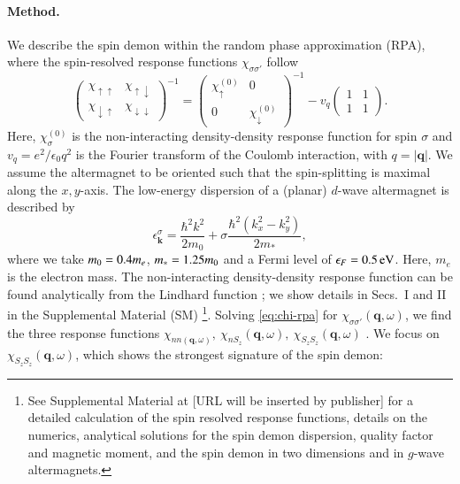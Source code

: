 \documentclass[aps,prl,reprint,twocolumns,superscriptaddress]{revtex4-2}
\DeclareMathOperator{\Imm}{Im}
\newcommand{\subfigref}[2]{Fig.~\hyperref[#1]{\ref*{#1}#2}}
\begin{document}
	
	
	
	
	
	
	\paragraph{Method.}
	We describe the spin demon within the random phase approximation (RPA), where the spin-resolved response functions $\chi_{\sigma\sigma'}$ follow \cite{giulianiQuantumTheoryElectron2005}
	\begin{equation}
		\begin{pmatrix}
			\chi_{\uparrow\uparrow} & \chi_{\uparrow\downarrow} \\ 
			\chi_{\downarrow\uparrow} & \chi_{\downarrow\downarrow}
		\end{pmatrix}^{-1} = \begin{pmatrix}
			\chi_\uparrow^{(0)} & 0 \\
			0 & \chi_\downarrow^{(0)}
		\end{pmatrix}^{-1}
		- v_q \begin{pmatrix}
			1 & 1 \\ 1 & 1 
		\end{pmatrix} \label{eq:chi-rpa}.
	\end{equation}
	Here, $\chi_\sigma^{(0)}$ is the non-interacting density-density response function for spin $\sigma$ and $v_q=e^2/\epsilon_0 q^2$ is the Fourier transform of the Coulomb interaction, with $q=|\bm q|$. We assume the altermagnet to be oriented such that the spin-splitting is maximal along the $x,y$-axis. The low-energy dispersion of a (planar) $d$-wave altermagnet is  described by \cite{smejkalEmergingResearchLandscape2022}
	\begin{equation}
		\epsilon_{\bm k}^\sigma = \frac{\hbar^2 k^2}{2m_0} + \sigma\frac{\hbar^2 \left( k_x^2-k_y^2\right)}{2m_*} ,
	\end{equation}
	where we take $m_0=0.4 m_e$, $m_*=1.25 m_0$ and a Fermi level of $\epsilon_F=\SI{0.5}{eV}$. Here, $m_e$ is the electron mass.
	The non-interacting density-density response function can  be found analytically from the Lindhard function \cite{ahnAnisotropicFermionicQuasiparticles2021}; we show details in Secs.~I and II in the Supplemental Material (SM) \footnote{See Supplemental Material at [URL will be inserted by publisher] for a detailed calculation of the spin resolved response functions, details on the numerics, analytical solutions for the spin demon dispersion, quality factor and magnetic moment, and the spin demon in two dimensions and in $g$-wave altermagnets.}. Solving \cref{eq:chi-rpa} for $\chi_{\sigma\sigma'}(\bm q,\omega)$, we find the three response functions $\chi_{nn(\bm q,\omega)},\ \chi_{nS_z}(\bm q,\omega),\ \chi_{S_zS_z}(\bm q,\omega)$ \cite{giulianiQuantumTheoryElectron2005}. We focus on $\chi_{S_zS_z}(\bm q,\omega)$, which shows the strongest signature of the spin demon:
\end{document}
